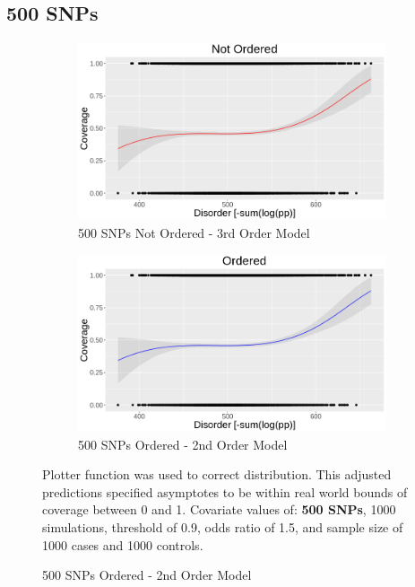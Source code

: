 \subsection{500 SNPs}
\begin{figure}[H]
    \begin{centering}
    \caption {Coverage and Disorder 500 SNPs}
    \begin{subfigure}[H]{\textwidth}
        \centering
        \includegraphics[width=\textwidth]{images/Coverage_and_Disorder_Charts/NotOrd_500SNPs.png}
        \caption{500 SNPs Not Ordered - 3rd Order Model}
        \label{}
    \end{subfigure}
    \hfill
    
    
    \begin{subfigure}[H]{\textwidth}
        \centering
        \includegraphics[width=\textwidth]{images/Coverage_and_Disorder_Charts/Ord_500SNPs.png}
        \caption{500 SNPs Ordered - 2nd Order Model}
        \label{}
    \end{subfigure}
    \label{}
\footnotesize
Plotter function was used to correct distribution. This adjusted predictions specified asymptotes to be within real world bounds of coverage between 0 and 1. Covariate values of: \textbf{500 SNPs}, 1000 simulations, threshold of 0.9, odds ratio of 1.5, and sample size of 1000 cases and 1000 controls.
\end{centering}
\end{figure}

